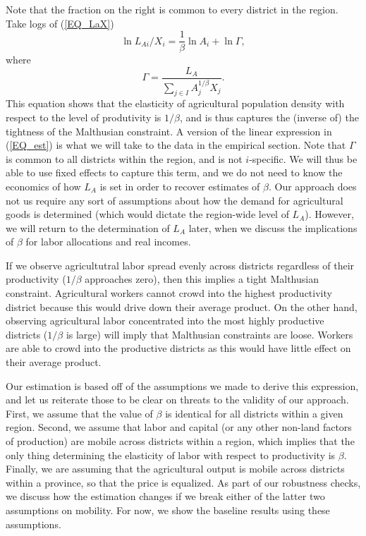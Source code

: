 \documentclass[11pt]{article}
\begin{document}
Note that the fraction on the right is common to every district in the region. Take logs of (\ref{EQ_LaX}) 
\begin{equation}
\ln L_{Ai}/X_i = \frac{1}{\beta} \ln A_{i} + \ln \Gamma, \label{EQ_est}
\end{equation}
where
\begin{equation}
    \Gamma = \frac{L_A}{\sum_{j\in I} A_{j}^{1/\beta}X_{j}}. \nonumber
\end{equation}
This equation shows that the elasticity of agricultural population density with respect to the level of produtivity is $1/\beta$, and is thus captures the (inverse of) the tightness of the Malthusian constraint. A version of the linear expression in (\ref{EQ_est}) is what we will take to the data in the empirical section. Note that $\Gamma$ is common to all districts within the region, and is not $i$-specific. We will thus be able to use fixed effects to capture this term, and we do not need to know the economics of how $L_A$ is set in order to recover estimates of $\beta$. Our approach does not us require any sort of assumptions about how the demand for agricultural goods is determined (which would dictate the region-wide level of $L_A$). However, we will return to the determination of $L_A$ later, when we discuss the implications of $\beta$ for labor allocations and real incomes.

If we observe agricultutral labor spread evenly across districts regardless of their productivity ($1/\beta$ approaches zero), then this implies a tight Malthusian constraint. Agricultural workers cannot crowd into the highest productivity district because this would drive down their average product. On the other hand, observing agricultural labor concentrated into the most highly productive districts ($1/\beta$ is large) will imply that Malthusian constraints are loose. Workers are able to crowd into the productive districts as this would have little effect on their average product.

Our estimation is based off of the assumptions we made to derive this expression, and let us reiterate those to be clear on threats to the validity of our approach. First, we assume that the value of $\beta$ is identical for all districts within a given region. Second, we assume that labor and capital (or any other non-land factors of production) are mobile across districts within a region, which implies that the only thing determining the elasticity of labor with respect to productivity is $\beta$. Finally, we are assuming that the agricultural output is mobile across districts within a province, so that the price is equalized. As part of our robustness checks, we discuss how the estimation changes if we break either of the latter two assumptions on mobility. For now, we show the baseline results using these assumptions.
\end{document}
